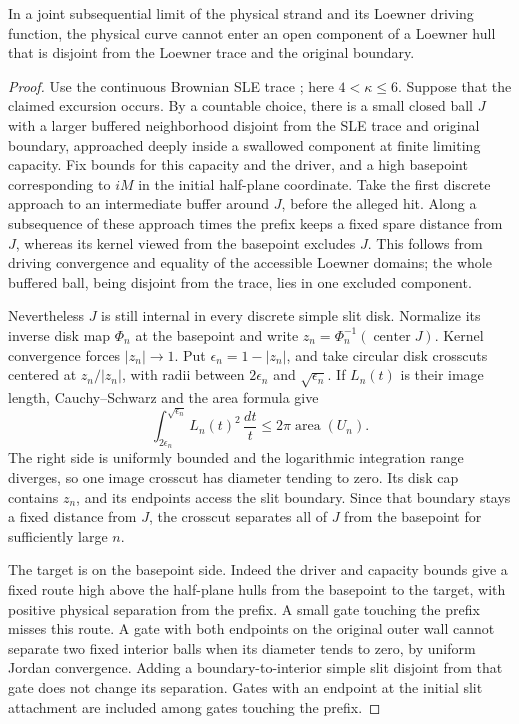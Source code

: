 \begin{lemma}
\label{chordal:gates}
In a joint subsequential limit of the physical strand and its
Loewner driving function, the physical curve cannot enter an open
component of a Loewner hull that is disjoint from the Loewner trace
and the original boundary.
\end{lemma}
\begin{proof}
Use the continuous Brownian SLE trace
\cite{RohdeSchramm2005}; here $4<\kappa\le6$.  Suppose that the
claimed excursion occurs.  By a countable choice, there is a small
closed ball $J$ with a larger buffered neighborhood disjoint from
the SLE trace and original boundary, approached deeply inside a
swallowed component at finite limiting capacity.  Fix bounds for
this capacity and the driver, and a high basepoint corresponding
to $iM$ in the initial half-plane coordinate.  Take the first discrete
approach to an intermediate buffer around $J$, before the alleged
hit.  Along a subsequence of these approach times the prefix keeps
a fixed spare distance from $J$, whereas its kernel viewed from the
basepoint excludes $J$.  This follows from driving convergence and
equality of the accessible Loewner domains; the whole buffered ball,
being disjoint from the trace, lies in one excluded component.

Nevertheless $J$ is still internal in every discrete simple slit
disk.  Normalize its inverse disk map $\Phi_n$ at the basepoint and
write $z_n=\Phi_n^{-1}(\operatorname{center}J)$.  Kernel convergence
forces $|z_n|\to1$.  Put $\epsilon_n=1-|z_n|$, and take circular
disk crosscuts centered at $z_n/|z_n|$, with radii between
$2\epsilon_n$ and $\sqrt{\epsilon_n}$.  If $L_n(t)$ is their image
length, Cauchy--Schwarz and the area formula give
\begin{equation}\label{chordal:gate-area}
 \int_{2\epsilon_n}^{\sqrt{\epsilon_n}}
            L_n(t)^2\,\frac{dt}{t}
       \le2\pi\operatorname{area}(U_n).
\end{equation}
The right side is uniformly bounded and the logarithmic integration
range diverges, so one image crosscut has diameter tending to zero.
Its disk cap contains $z_n$, and its endpoints access the slit
boundary.  Since that boundary stays a fixed distance from $J$, the
crosscut separates all of $J$ from the basepoint for sufficiently
large $n$.

The target is on the basepoint side.  Indeed the driver and capacity
bounds give a fixed route high above the half-plane hulls from the
basepoint to the target, with positive physical separation from the
prefix.  A small gate touching the prefix misses this route.  A gate
with both endpoints on the original outer wall cannot separate two
fixed interior balls when its diameter tends to zero, by uniform
Jordan convergence.  Adding a boundary-to-interior simple slit
disjoint from that gate does not change its separation.  Gates with
an endpoint at the initial slit attachment are included among gates
touching the prefix.


\end{proof}
